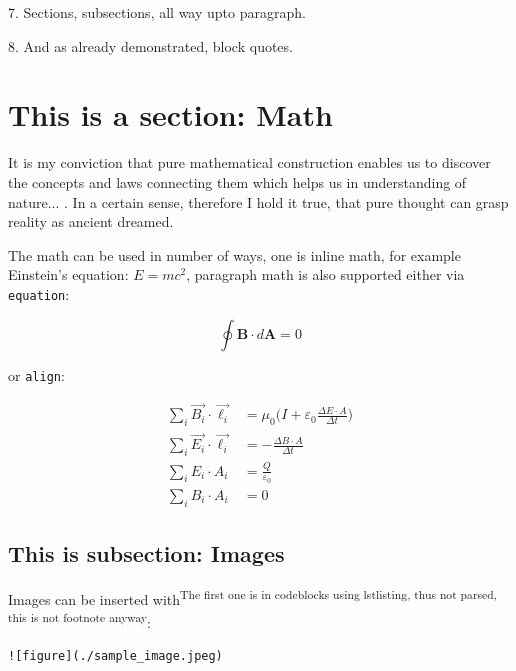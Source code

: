 \documentclass[12pt, UTF8]{article}
\begin{document}
	7. Sections, subsections, all way upto paragraph.
	
	8. And as already demonstrated, block quotes.
	
	\newpage
	
	\section{This is a section: Math}
	
	\begin{displayquote}
		It is my conviction that pure mathematical construction enables us to discover
		the concepts and laws connecting them which helps us in understanding of nature... .
		In a certain sense, therefore I hold it true, that pure thought
		can grasp reality as ancient dreamed.
	\end{displayquote}
	
	The math can be used in number of ways, one is inline math, for example Einstein's equation: $E = mc^2$, paragraph math is also supported either via \texttt{equation}:
	
	\begin{equation}
		\oint \boldsymbol{B} \cdot d \boldsymbol{A} = 0
	\end{equation}
	
	or \texttt{align}:
	
	\begin{align}
		\sum_{i} \vec{B_{i}} \cdot \vec{\ell_{i}} &= \mu_{0} \bigg(I + \varepsilon_{0} \frac{\Delta E \cdot A}{\Delta t} \bigg) \\
		\sum_{i} \vec{E_{i}} \cdot \vec{\ell_{i}} &= - \frac{\Delta B \cdot A}{\Delta t} \\
		\sum_{i} E_{i} \cdot A_{i} &= \frac{Q}{\varepsilon_{0}} \\
		\sum_{i} B_{i} \cdot A_{i} &= 0 
	\end{align}
	
	\subsection{This is subsection: Images}
	
	Images can be inserted with\textsuperscript{The first one is in codeblocks using lstlisting, thus not parsed, this is not footnote anyway}:
	
\begin{lstlisting}
![figure](./sample_image.jpeg)
\end{lstlisting}
	
\end{document}
